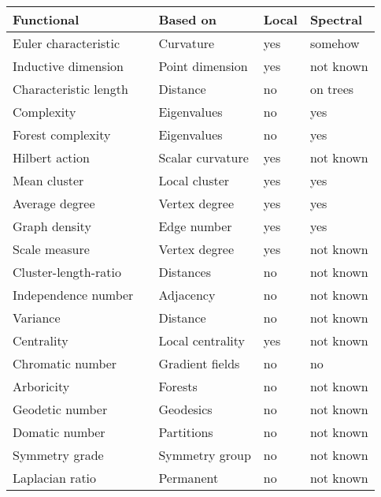 \documentclass[12pt]{amsart}
\theoremstyle{definition}
\begin{document}
\begin{center}
\begin{tabular}{|l|l|l|l|l|} \hline
Functional               &        &  Based  on          &   Local  &  Spectral         \\ \hline 
Euler characteristic     &  &  Curvature          &   yes    &  somehow \cite{knillmckeansinger}  \\ 
Inductive dimension      & &  Point dimension    &   yes    &  not known        \\
Characteristic length    &   &  Distance           &   no     &  on trees \cite{GoddardOellermann}  \\ 
Complexity               &   &  Eigenvalues        &   no     &  yes              \\ 
Forest complexity        &  &  Eigenvalues      &   no     &  yes              \\
Hilbert action           &  &  Scalar curvature   &   yes    &  not known        \\
Mean cluster             &   &  Local cluster      &   yes    &  yes              \\ 
Average degree           &&  Vertex degree      &   yes    &  yes              \\ 
Graph density            && Edge number       &   yes    &  yes              \\
Scale measure            &&  Vertex degree      &   yes    &  not known        \\
Cluster-length-ratio     && Distances          &   no     &  not known        \\
Independence number      &  & Adjacency          &   no     &  not known        \\
Variance                 &     &  Distance           &   no     &  not known        \\
Centrality               &     &  Local centrality   &   yes    &  not known        \\
Chromatic number         &     &  Gradient fields    &   no     &  no \cite{Cvetkovic} \\
Arboricity               &     &  Forests            &   no     &  not known        \\
Geodetic number          &     &  Geodesics          &   no     &  not known        \\ 
Domatic number           &     &  Partitions         &   no     &  not known        \\
Symmetry grade           &     &  Symmetry group     &   no     &  not known        \\
Laplacian ratio          &     &  Permanent          &   no     &  not known        \\ \hline
\end{tabular}
\end{center}
\end{document}
